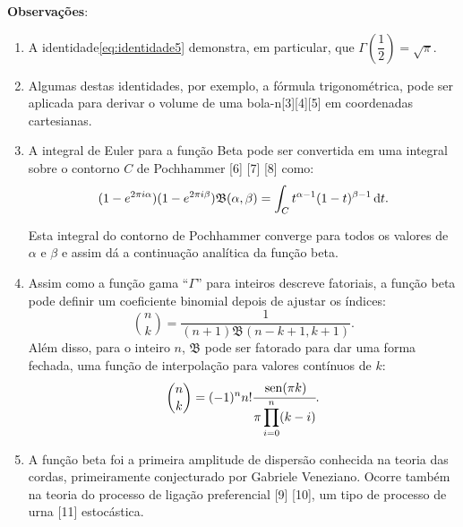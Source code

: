 
\textbf{Observações}:

\begin{enumerate}
\item A identidade\eqref{eq:identidade5} demonstra, em particular, que \(\displaystyle \Gamma\left(\dfrac{1}{2}\right) = \sqrt{\pi}\).

\item Algumas destas identidades, por exemplo, a fórmula trigonométrica, pode ser aplicada para derivar o volume de uma bola-n[3][4][5] em coordenadas cartesianas.

\item A integral de Euler para a função Beta pode ser convertida em uma integral sobre o contorno \(C\) de Pochhammer [6] [7] [8] como:
\begin{equation}
\displaystyle \displaystyle (1-e^{2\pi i\alpha})(1-e^{2\pi i\beta})\mathfrak{B}(\alpha ,\beta) = \int_{C} t^{\alpha-1}(1-t)^{\beta-1}\, \mathrm{d} t.
\end{equation}

Esta integral do contorno de Pochhammer converge para todos os valores de \(\alpha\) e \(\beta\) e assim dá a continuação analítica da função beta.

\item Assim como a função gama ``\(\Gamma\)'' para inteiros descreve fatoriais, a função beta pode definir um coeficiente binomial depois de ajustar os índices:
\[\displaystyle \binom{n}{k} = \dfrac{1}{(n+1) \mathfrak{B}(n-k+1,k+1)}.\]
Além disso, para o inteiro \(n\), \(\displaystyle \mathfrak{B}\) pode ser fatorado para dar uma forma fechada, uma função de interpolação para valores contínuos de \(k\):
\begin{equation}
\displaystyle \binom{n}{k} = (-1)^{n}n! {\cfrac{\sin(\pi k)}{\pi \displaystyle \prod_{i=0}^{n}(k-i)}}.
\end{equation}

\item A função beta foi a primeira amplitude de dispersão conhecida na teoria das cordas, primeiramente conjecturado por Gabriele Veneziano. Ocorre também na teoria do processo de ligação preferencial [9] [10], um tipo de processo de urna [11] estocástica.
\end{enumerate}

